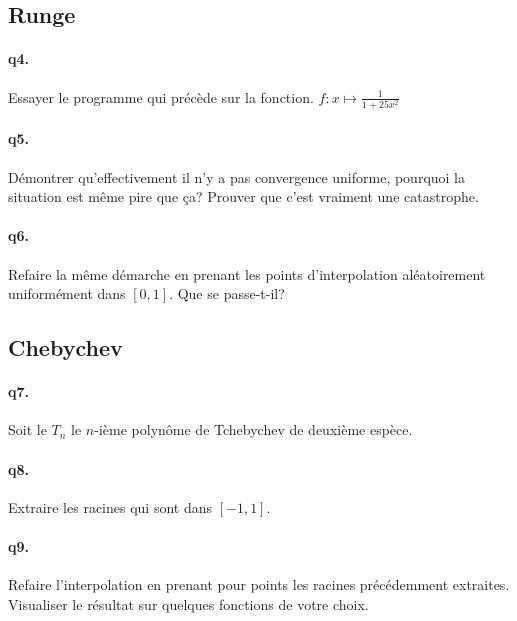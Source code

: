 \documentclass[10pt,a4paper]{article}
\begin{document}
\subsection{Runge}
\paragraph{q4.}Essayer le programme qui précède sur la fonction. $    f:x \mapsto \frac{1}{1+25x^2} $
\paragraph{q5.}Démontrer qu'effectivement il n'y a pas convergence uniforme, pourquoi la situation est même pire que ça? Prouver que c'est vraiment une catastrophe.
\paragraph{q6.}Refaire la même démarche en prenant les points d'interpolation aléatoirement uniformément dans $[0,1]$. Que se passe-t-il?
\subsection{Chebychev}
\paragraph{q7.} Soit le $T_n$ le $n$-ième polynôme de Tchebychev de deuxième espèce.
\paragraph{q8.} Extraire les racines qui sont dans $[-1,1]$.
\paragraph{q9.} Refaire l'interpolation en prenant pour points les racines précédemment extraites. Visualiser le résultat sur quelques fonctions de votre choix.
\end{document}
